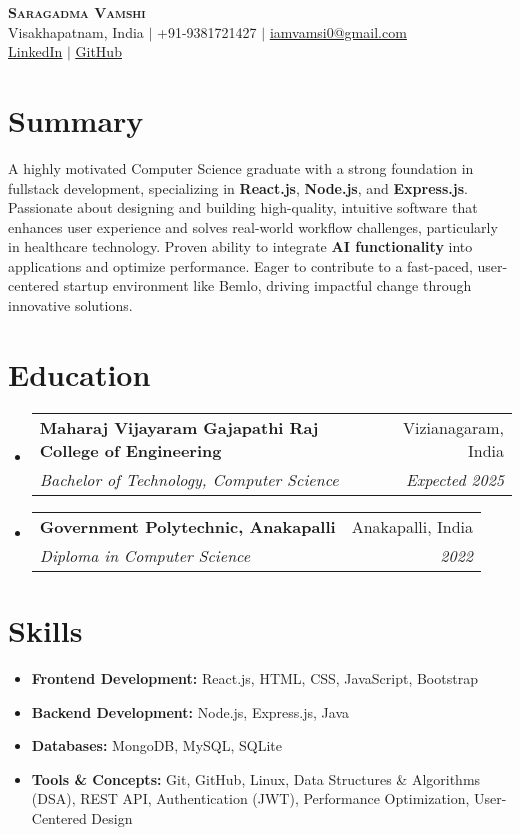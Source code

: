 \documentclass[11pt]{article}
\makeatletter
\newcommand{\resumeSubheading}[4]{
    \item
    \begin{tabular*}{0.97\textwidth}[t]{l@{\extracolsep{\fill}}r}
        \textbf{#1} & #2 \\
        \textit{\small#3} & \textit{\small #4}
    \end{tabular*}
}
\newcommand{\resumeSubHeadingListStart}{\begin{itemize}[leftmargin=0.15in, label={}]}
\newcommand{\resumeSubHeadingListEnd}{\end{itemize}}
\makeatother
\begin{document}
\begin{center}
    \textbf{\Huge \scshape Saragadma Vamshi} \\ \vspace{4pt}
    Visakhapatnam, India $|$ +91-9381721427 $|$ \href{mailto:iamvamsi0@gmail.com}{\underline{iamvamsi0@gmail.com}} \\
    \href{https://linkedin.com/in/yourprofile}{\underline{LinkedIn}} $|$ \href{https://github.com/yourprofile}{\underline{GitHub}} %
\end{center}

\section*{Summary}
A highly motivated Computer Science graduate with a strong foundation in fullstack development, specializing in \textbf{React.js}, \textbf{Node.js}, and \textbf{Express.js}. Passionate about designing and building high-quality, intuitive software that enhances user experience and solves real-world workflow challenges, particularly in healthcare technology. Proven ability to integrate \textbf{AI functionality} into applications and optimize performance. Eager to contribute to a fast-paced, user-centered startup environment like Bemlo, driving impactful change through innovative solutions.

\section*{Education}
\resumeSubHeadingListStart
    \resumeSubheading
    {Maharaj Vijayaram Gajapathi Raj College of Engineering}{Vizianagaram, India}
    {Bachelor of Technology, Computer Science}{Expected 2025}
    \resumeSubheading
    {Government Polytechnic, Anakapalli}{Anakapalli, India}
    {Diploma in Computer Science}{2022}
\resumeSubHeadingListEnd

\section*{Skills}
\begin{itemize}[leftmargin=0.15in, label={}]
    \item \small{\textbf{Frontend Development:} React.js, HTML, CSS, JavaScript, Bootstrap}
    \item \small{\textbf{Backend Development:} Node.js, Express.js, Java}
    \item \small{\textbf{Databases:} MongoDB, MySQL, SQLite}
    \item \small{\textbf{Tools \& Concepts:} Git, GitHub, Linux, Data Structures \& Algorithms (DSA), REST API, Authentication (JWT), Performance Optimization, User-Centered Design}
\end{itemize}
\end{document}
